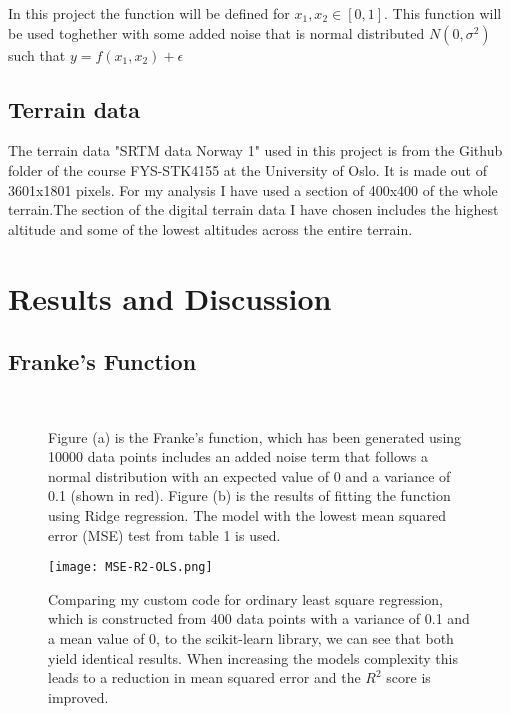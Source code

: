 \documentclass[a4paper,12pt]{article}
\begin{document}
\noindent
In this project the function will be defined for $x_1,x_2\in [0,1]$. This function will be used toghether with some added noise that is normal distributed $N(0,\sigma^2)$ such that $y=f(x_1,x_2)+\epsilon$




\subsection{Terrain data}
The terrain data "SRTM data Norway 1" used in this project is from the Github folder of the course FYS-STK4155 at the University of Oslo. It is made out of 3601x1801 pixels. For my analysis I have used a section of 400x400 of the whole terrain.The section of the digital terrain data I have chosen includes the highest altitude and some of the lowest altitudes across the entire terrain.


\cleardoublepage
\section{Results and Discussion}



\subsection{Franke's Function}





\begin{figure}[H]
\\
\caption{Figure (a) is the Franke's function, which has been generated using 10000 data points  includes an added noise term that follows a normal distribution with an expected value of 0 and a variance of 0.1 (shown in red). Figure (b) is  the results of fitting the function using Ridge regression. The model with the lowest mean squared error (MSE) test from table 1 is used.}
\end{figure}







\begin{figure}[H]
\centerline{\texttt{[image: MSE-R2-OLS.png]}}
\caption{Comparing my custom code for ordinary least square regression, which is constructed from 400 data points with a variance of 0.1 and a mean value of 0, to the scikit-learn library, we can see that both yield identical results. When increasing the models complexity this leads to a reduction in mean squared error and the $R^2$ score is improved. }
\label{fig}
\end{figure}
\end{document}
